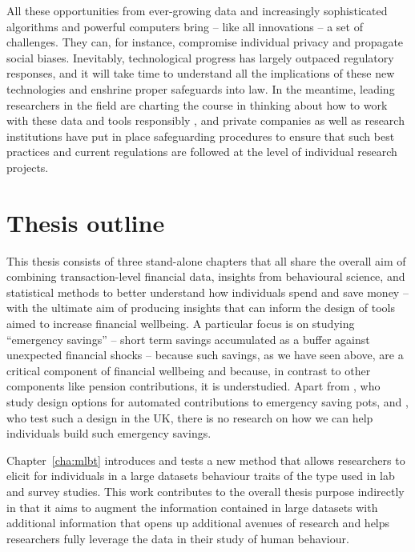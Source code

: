 All these opportunities from ever-growing data and increasingly sophisticated
algorithms and powerful computers bring -- like all innovations -- a set of
challenges. They can, for instance, compromise individual privacy and propagate
social biases. Inevitably, technological progress has largely outpaced
regulatory responses, and it will take time to understand all the implications
of these new technologies and enshrine proper safeguards into law. In the
meantime, leading researchers in the field are charting the course in thinking
about how to work with these data and tools responsibly
\citep{demontjoye2015unique, kosinski2015facebook, blumenstock2018don}, and
private companies as well as research institutions have put in place
safeguarding procedures to ensure that such best practices and current
regulations are followed at the level of individual research projects.


\section{Thesis outline}%
\label{sec:objectives}

This thesis consists of three stand-alone chapters that all share the overall
aim of combining transaction-level financial data, insights from behavioural
science, and statistical methods to better understand how individuals spend and
save money -- with the ultimate aim of producing insights that can inform the
design of tools aimed to increase financial wellbeing. A particular focus is on
studying ``emergency savings'' -- short term savings accumulated as a buffer
against unexpected financial shocks -- because such savings, as we have seen
above, are a critical component of financial wellbeing and because, in contrast
to other components like pension contributions, it is understudied. Apart from
\citet{beshears2020building}, who study design options for automated
contributions to emergency saving pots, and \citet{phillips2021supporting}, who
test such a design in the UK, there is no research on how we can help
individuals build such emergency savings.

Chapter~\ref{cha:mlbt} introduces and tests a new method that allows
researchers to elicit for individuals in a large datasets behaviour traits of
the type used in lab and survey studies. This work contributes to the overall
thesis purpose indirectly in that it aims to augment the information contained
in large datasets with additional information that opens up additional avenues
of research and helps researchers fully leverage the data in their study of
human behaviour. 

